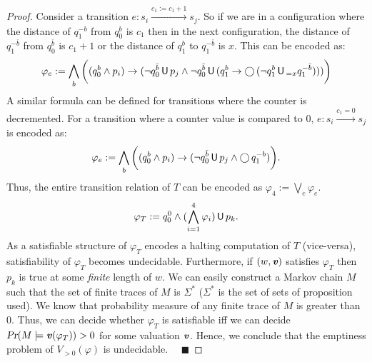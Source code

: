 \documentclass{llncs}
\renewcommand{\Pr}{\mbox{\rm Pr}}
\renewcommand{\Pr}{\mbox{\sl Pr}}
\newcommand{\Next}{\bigcirc \, }
\newcommand{\Until}{\mbox{$\, {\sf U}\,$}}
\newcommand{\U}{\Until}
\newcommand{\X}{\Next}
\renewcommand{\a}[1]{\textbf{\textit{#1}}}
\newcommand{\ve}{{{\a v}}}
\begin{document}
\begin{proof}
Consider a transition $e:s_i\xrightarrow{c_1:=c_1+1} s_j$. So if we are in a configuration where the distance of $q_1^{-b}$ from $q_0^b$ is $c_1$ then
in the next configuration, the distance of $q_1^{-\bar b}$ from $q_0^{\bar b}$ is $c_1+1$ or the distance of $q_1^{b}$ to $q_1^{-\bar b}$ is $x$. This
can be encoded as:
\[
 \varphi_e := \bigwedge_b\bigg( (q_0^b\wedge p_i) \to (\neg q_0^{\bar b}\U p_j \wedge \neg q_0^{\bar b}\U(q_1^{b}\to\X(\neg q_1^b\U_{=x}q_1^{-\bar b})))\bigg) 
\] A similar formula can be defined for transitions where the counter is decremented. For a transition where a counter value is compared to $0$,
$e: s_i\xrightarrow{c_1=0}s_j$ is encoded as:
\[
 \varphi_e := \bigwedge_b\bigg((q_0^b\wedge p_i) \to (\neg q_0^{\bar b}\U p_j \wedge \X q_1^{-b})\bigg).
\] Thus, the entire transition relation of $T$ can be encoded as $\varphi_4 := \bigvee_e \varphi_e$. 
\[
\varphi_T:= q_0^0\wedge (\bigwedge_{i=1}^4 \varphi_i) \U p_k.  
\] As a satisfiable structure of $\varphi_T$ encodes a halting computation of $T$ (vice-versa), 
satisfiability of $\varphi_T$ becomes undecidable. Furthermore,
 if $(w,\ve)$ satisfies $\varphi_T$ then $p_k$ is true at some \emph{finite} length of $w$. 
 We can easily construct a
Markov chain $M$ such that the set of finite traces of $M$ is $\Sigma^*$ ($\Sigma^*$ is the set of sets of proposition used).  We know that probability
measure of any finite trace of $M$ is greater than $0$. Thus, we can decide whether $\varphi_T$ is satisfiable iff we can decide 
$\Pr(M\models{\a v}(\varphi_T))>0$ for some valuation ${\a v}$. Hence, 
we  conclude that the emptiness problem of $V_{>0}(\varphi)$ is undecidable. 
\hfill $\quad\blacksquare$\end{proof}
\end{document}

